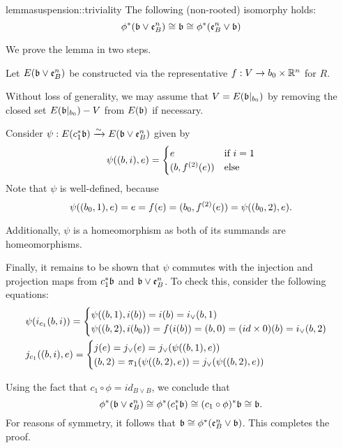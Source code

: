 \begin{mystatement}{lemma}{suspension::triviality}
    The following (non-rooted) isomorphy holds:
    \[ \ind{\phi}(\bb \vee \be{B}) \cong \bb \cong \ind{\phi}(\be{B} \vee \bb) \]
\end{mystatement}

\begin{myproof}
    We prove the lemma in two steps.
    \begin{steps}
        
        Let $E(\bb \vee \be{B})$ be constructed via 
        the representative $f: V \to b_0 \cross \R^n$ for $R$.

        Without loss of generality, we may assume that
        $V = E(\bbb)$ by removing the closed set $E(\bbb) - V$ from $E(\bb)$ if necessary.

        Consider $\psi: E(\ind{c_1}\bb) \isomto E(\bb \vee \be{B})$ given by
        \[ \psi((b, i), e) = \case{e}{(b, \snd{f}(e))}{i = 1} \]
        Note that $\psi$ is well-defined, because
        \[ \psi((b_0, 1), e) = e = f(e) = (b_0, \snd{f}(e)) = \psi((b_0, 2), e). \]

        Additionally, $\psi$ is a homeomorphism as both of its summands are homeomorphisms.

        Finally, it remains to be shown that $\psi$
        commutes with the injection and projection maps from $\ind{c_1}\bb$ and $\bb \vee \be{B}$.
        To check this, consider the following equations:
        \begin{align}
            &\psi(i_{c_1}(b, i)) = \casenif{\psi((b, 1), i(b)) = i(b) = i_\vee(b, 1)}{\psi((b, 2), i(b_0)) = f(i(b)) = (b, 0) = (id \cross 0)(b) = i_\vee(b, 2)} \\
            &j_{c_1}((b, i), e) = \casenif{j(e) = j_\vee(e) = j_\vee(\psi((b, 1), e))}{(b, 2) = \pi_1(\psi((b, 2), e)) = j_\vee(\psi((b, 2), e))}
        \end{align}
        

        Using the fact that $c_1 \circ \phi = id_{B \vee B}$, we conclude that
        \[ \ind{\phi}(\bb \vee \be{B}) \cong \ind{\phi}(\ind{c_1}\bb) \cong \ind{(c_1 \circ \phi)}\bb \cong \bb. \]
        For reasons of symmetry, it follows that $\bb \cong \ind{\phi}(\be{B} \vee \bb)$.
        This completes the proof.
    \end{steps}
\end{myproof}